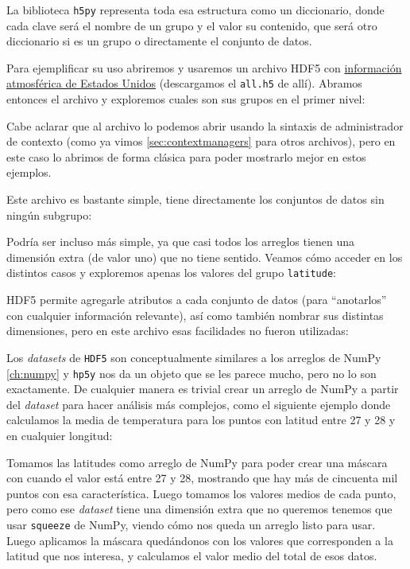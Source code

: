 La biblioteca \texttt{h5py} representa toda esa estructura como un diccionario, donde cada clave será el nombre de un grupo y el valor su contenido, que será otro diccionario si es un grupo o directamente el conjunto de datos.

Para ejemplificar su uso abriremos y usaremos un archivo HDF5 con \href{https://data.nrel.gov/submissions/70}{información atmosférica de Estados Unidos} (descargamos el \texttt{all.h5} de allí). Abramos entonces el archivo y exploremos cuales son sus grupos en el primer nivel:


Cabe aclarar que al archivo lo podemos abrir usando la sintaxis de administrador de contexto (como ya vimos \ref{sec:contextmanagers} para otros archivos), pero en este caso lo abrimos de forma clásica para poder mostrarlo mejor en estos ejemplos.

Este archivo es bastante simple, tiene directamente los conjuntos de datos sin ningún subgrupo:


Podría ser incluso más simple, ya que casi todos los arreglos tienen una dimensión extra (de valor uno) que no tiene sentido. Veamos cómo acceder en los distintos casos y exploremos apenas los valores del grupo \texttt{latitude}:


HDF5 permite agregarle atributos a cada conjunto de datos (para ``anotarlos'' con cualquier información relevante), así como también nombrar sus distintas dimensiones, pero en este archivo esas facilidades no fueron utilizadas:


Los \textit{datasets} de \texttt{HDF5} son conceptualmente similares a los arreglos de NumPy \ref{ch:numpy} y \texttt{hp5y} nos da un objeto que se les parece mucho, pero no lo son exactamente. De cualquier manera es trivial crear un arreglo de NumPy a partir del \textit{dataset} para hacer análisis más complejos, como el siguiente ejemplo donde calculamos la media de temperatura para los puntos con latitud entre 27 y 28 y en cualquier longitud:


Tomamos las latitudes como arreglo de NumPy para poder crear una máscara con  cuando el valor está entre 27 y 28, mostrando que hay más de cincuenta mil puntos con esa característica. Luego tomamos los valores medios de cada punto, pero como ese \textit{dataset} tiene una dimensión extra que no queremos tenemos que usar \texttt{squeeze} de NumPy, viendo cómo nos queda un arreglo listo para usar. Luego aplicamos la máscara quedándonos con los valores que corresponden a la latitud que nos interesa, y calculamos el valor medio del total de esos datos.


